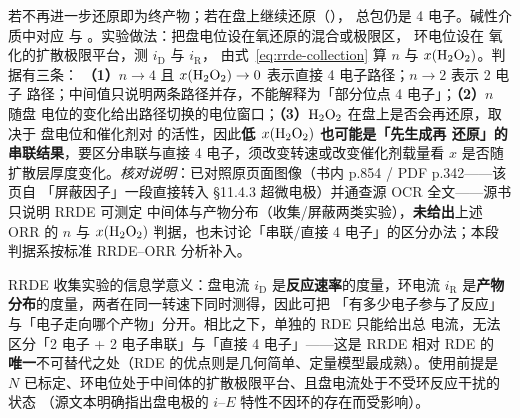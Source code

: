  若不再进一步还原即为终产物；若在盘上继续还原（），
总包仍是 4 电子。碱性介质中对应  与
。实验做法：把盘电位设在氧还原的混合或极限区，
环电位设在  氧化的扩散极限平台，测 $i_{\mathrm{D}}$ 与 $i_{\mathrm{R}}$，
由式~\eqref{eq:rrde-collection} 算 $n$ 与 $x(\ce{H2O2})$。判据有三条：
\textbf{（1）}$n\to4$ 且 $x(\ce{H2O2})\to0$ 表示直接 4 电子路径；$n\to2$ 表示 2 电子
路径；中间值只说明两条路径并存，不能解释为「部分位点 4 电子」；\textbf{（2）}$n$ 随盘
电位的变化给出路径切换的电位窗口；\textbf{（3）}$\ce{H2O2}$ 在盘上是否会再还原，取决于
盘电位和催化剂对  的活性，因此\textbf{低 $x(\ce{H2O2})$ 也可能是「先生成再
还原」的串联结果}，要区分串联与直接 4 电子，须改变转速或改变催化剂载量看 $x$ 是否随
扩散层厚度变化。\emph{核对说明}：已对照原页面图像（书内 p.854 / PDF p.342——该页自
「屏蔽因子」一段直接转入 §11.4.3 超微电极）并通查源 OCR 全文——源书只说明 RRDE 可测定
中间体与产物分布（收集/屏蔽两类实验），\textbf{未给出}上述 ORR 的 $n$ 与 $x(\ce{H2O2})$
判据，也未讨论「串联/直接 4 电子」的区分办法；本段判据系按标准 RRDE--ORR 分析补入。

\begin{principle}
RRDE 收集实验的信息学意义：盘电流 $i_{\mathrm{D}}$ 是\textbf{反应速率}的度量，环电流
$i_{\mathrm{R}}$ 是\textbf{产物分布}的度量，两者在同一转速下同时测得，因此可把
「有多少电子参与了反应」与「电子走向哪个产物」分开。相比之下，单独的 RDE 只能给出总
电流，无法区分「2 电子 + 2 电子串联」与「直接 4 电子」——这是 RRDE 相对 RDE 的
\textbf{唯一}不可替代之处（RDE 的优点则是几何简单、定量模型最成熟）。使用前提是
$N$ 已标定、环电位处于中间体的扩散极限平台、且盘电流处于不受环反应干扰的状态
（源文本明确指出盘电极的 $i$–$E$ 特性不因环的存在而受影响）。
\end{principle}

